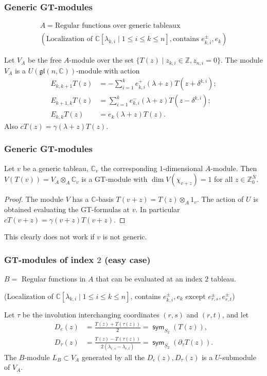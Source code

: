 \documentclass[smaller,usepdftitle=false]{beamer}
\newcommand\CC{\mathbb C}
\newcommand\ZZ{\mathbb Z}
\newcommand\ot{\otimes}
\newcommand\gl{\mathfrak{gl}}
\DeclareMathOperator\sym{\mathsf{sym}}
\begin{document}
\begin{frame}
\frametitle{Generic GT-modules}
\vspace{-1cm}
\begin{gather*}
A = \mbox{Regular functions over generic tableaux}  \\
(\mbox{Localization of }\CC[\lambda_{k,i} \mid 1 \leq i \leq k \leq n], 
\mbox{contains } e^\pm_{k,i}, e_k) 
\end{gather*}

\begin{Theorem}
Let $V_A$ be the free $A$-module over the set $\{T(z) \mid z_{k,i} 
\in \ZZ, z_{n,i} = 0\}$. The module $V_A$ is a $U(\gl(n,\CC))$-module with 
action
\vspace{-.3cm}
\begin{align*}
E_{k,k+1} T(z) &= - \sum_{i=1}^k e^+_{k,i}(\lambda + z) 
	T(z+\delta^{k,i}); \\
E_{k+1,k} T(z) &= \sum_{i=1}^k e^-_{k,i}(\lambda + z) 
	T(z -\delta^{k,i}); \\
E_{k,k} T(z) &= e_k(\lambda + z) T(z).
\end{align*}
Also $c T(z) = \gamma(\lambda + z) T(z)$.
\end{Theorem}
\end{frame}

\begin{frame}
\frametitle{Generic GT-modules}
\begin{Corollary}
Let $v$ be a generic tableau, $\CC_v$ the corresponding $1$-dimensional 
$A$-module. Then $V(T(v)) = V_A \ot_A \CC_v$ is a GT-module with $
\dim V(\chi_{v+z}) =1$ for all $z \in \ZZ^N_0$. 
\end{Corollary}
\begin{proof}
The module $V$ has a $\CC$-basis $T(v + z) = T(z) \ot_A 1_v$. The 
action of $U$ is obtained evaluating the GT-formulas at $v$. In particular
$c T(v+z) = \gamma(v+z) T(v+z)$.
\end{proof}
\pause

This clearly does not work if $v$ is not generic.
\end{frame}

\begin{frame}
\frametitle{GT-modules of index $2$ (easy case)}
$B =$ Regular functions in $A$ that can be evaluated at an index $2$ tableau.

(Localization of $\CC[\lambda_{k,i} \mid 1 \leq i \leq k \leq n]$, 
contains $e^\pm_{k,i}, e_k \mbox{ except } e^\pm_{r,s}, 
	e^{\pm}_{r,t}$) 
\pause
\begin{Theorem}[Z, '17]
Let $\tau$ be the involution interchanging coordinates $(r,s)$ and $(r,t)$, 
and let 
\begin{align*}
D_e(z)
	&= \frac{T(z) + T(\tau(z))}{2} = \sym_{S_2}(T(z)),\\
D_\tau(z)
	&= \frac{T(z) - T(\tau(z))}
	{2(\lambda_{r,s} - \lambda_{r,t})} = \sym_{S_2}(\partial_\tau T(z)).
\end{align*}
The $B$-module $L_B \subset V_A$ generated by all the $D_e(z), D_\tau(z)$ is a 
$U$-submodule of $V_A$. 
\end{Theorem}
\end{frame}
\end{document}
